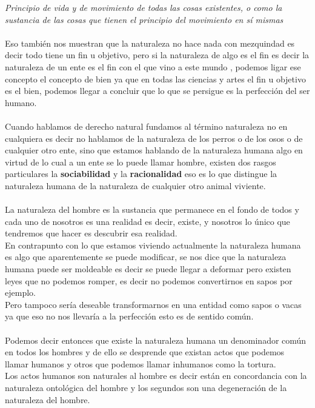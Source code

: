 \documentclass[12pt]{book}
\begin{document}
\textit{Principio de vida y de movimiento de todas las cosas existentes, o como la sustancia de las cosas que tienen el principio del movimiento en sí mismas}
\\ \\
Eso también nos muestran que la naturaleza no hace nada con mezquindad es decir todo tiene un fin u objetivo, pero si la naturaleza de algo es el fin es decir la naturaleza de un ente es el fin con el que vino a este mundo , podemos ligar ese concepto el concepto de bien ya que en todas las ciencias y artes el fin u objetivo es el bien, podemos llegar a concluir que lo que se persigue es la perfección del ser humano.
\\ \\
Cuando hablamos de derecho natural fundamos al término naturaleza no en cualquiera es decir no hablamos de la naturaleza de los perros o de los osos o de cualquier otro ente, sino que estamos hablando de la naturaleza humana algo en virtud de lo cual a un ente se lo puede llamar hombre, existen dos rasgos particulares la \textbf{sociabilidad} y la \textbf{racionalidad} eso es lo que distingue la naturaleza humana de la naturaleza de cualquier otro animal viviente.
\\ \\
La naturaleza del hombre es la sustancia que permanece en el fondo de todos y cada uno de nosotros es una realidad es decir, existe,  y nosotros lo único que tendremos que hacer es descubrir esa realidad.
\\
En contrapunto con lo que estamos viviendo actualmente la naturaleza humana es algo que aparentemente se puede modificar, se nos dice que la naturaleza humana puede ser moldeable es decir se puede llegar a deformar pero existen leyes que no podemos romper, es decir no podemos convertirnos en sapos por ejemplo. \\
Pero tampoco sería deseable transformarnos en una entidad como sapos o vacas ya que eso no nos llevaría a la perfección esto es de sentido común.
\\ \\
Podemos decir entonces que existe la naturaleza humana un denominador común en todos los hombres y de ello se desprende que existan actos que podemos llamar humanos y otros que podemos llamar inhumanos como la tortura. \\
Los actos humanos son naturales al hombre es decir están en concordancia con la naturaleza ontológica del hombre y los segundos son una degeneración de la naturaleza del hombre.
\\ \\
\end{document}
